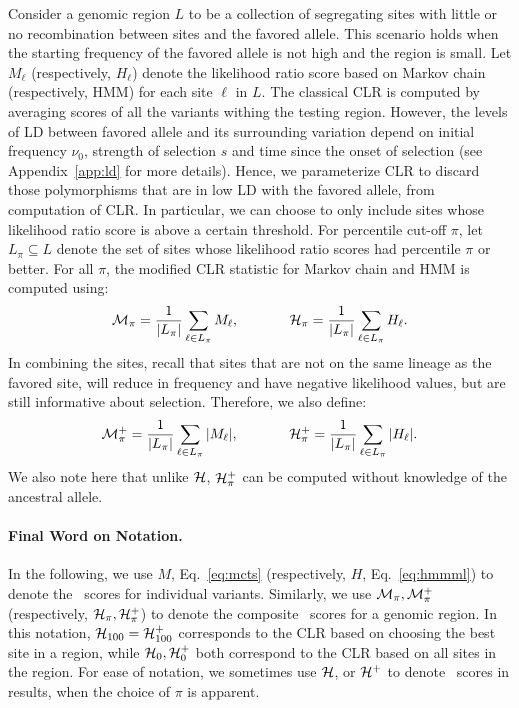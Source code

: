 Consider a genomic region $L$ to be a collection of segregating sites
with little or no recombination between sites and the favored
allele. This scenario holds when the starting frequency of the favored
allele is not high and the region is small. Let $M_\ell$
(respectively, $H_\ell$) denote the likelihood ratio score based on
Markov chain (respectively, HMM) for each site $\ell$ in $L$. The
classical CLR is computed by averaging scores of all the variants
withing the testing region.  However, the levels of LD between favored
allele and its surrounding variation depend on initial frequency
$\nu_0$, strength of selection $s$ and time since the onset of
selection (see Appendix~\ref{app:ld} for more details).  Hence, we
parameterize CLR to discard those polymorphisms that are in low LD
with the favored allele, from computation of CLR.  In particular, we
can choose to only include sites whose likelihood ratio score is above
a certain threshold. For percentile cut-off $\pi$, let
$L_{\pi}\subseteq L$ denote the set of sites whose likelihood ratio
scores had percentile $\pi$ or better. For all $\pi$, the modified CLR
statistic for Markov chain and HMM is computed using: 
\begin{equation}
 {\cal M}_{\pi} = \frac{1}{|L_{\pi}|}\sum_{\ell \in L_{\pi}}M_\ell,
\hspace{0.5in}
 {\cal H}_{\pi} = \frac{1}{|L_{\pi}|}\sum_{\ell \in L_{\pi}} H_\ell.
\label{eq:pihmm}
\end{equation}
In combining the sites, recall that sites that are not on the same
lineage as the favored site, will reduce in frequency and have
negative likelihood values, but are still informative about
selection. Therefore, we also define:
\begin{equation}
 {\cal M}^{+}_{\pi} = \frac{1}{|L_{\pi}|}\sum_{\ell \in L_{\pi}}\vert M_\ell\vert ,
\hspace{0.5in}
 {\cal H}^{+}_{\pi} = \frac{1}{|L_{\pi}|}\sum_{\ell \in L_{\pi}}\vert H_\ell\vert.
\label{eq:pihmmplus}
\end{equation}
We also note here that unlike ${\cal H}$, ${\cal H}^{+}_{\pi}$ can be computed
without knowledge of the ancestral allele.
\paragraph{Final Word on Notation.}
In the following, we use $M$, Eq.~\ref{eq:mcts} (respectively, $H$,
Eq.~\ref{eq:hmmml}) to denote the \comale\ scores for individual
variants. Similarly, we use ${\cal M}_{\pi},{\cal M}^{+}_{\pi}$ (respectively,
${\cal H}_{\pi},{\cal H}^{+}_{\pi}$) to denote the composite \comale\ scores for
a genomic region. In this notation, ${\cal H}_{100}={\cal
  H}^{+}_{100}$ corresponds to the CLR based on choosing the best site
in a region, while ${\cal H}_0,{\cal H}^{+}_0$ both correspond to the CLR based
on all sites in the region. For ease of notation, we sometimes use
${\cal H}$, or ${\cal H}^{+}$ to denote \comale\ scores in results, when the
choice of $\pi$ is apparent.

